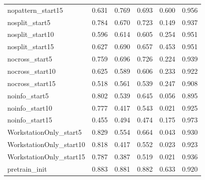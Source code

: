 \begin{table}[htbp]
\begin{tabularx}{\textwidth}{@{}lXXXXX@{}}
nopattern\_start15 & 0.631 & 0.769 & 0.693 & 0.600 & 0.956 \\
nosplit\_start5 & 0.784 & 0.670 & 0.723 & 0.149 & 0.937 \\
nosplit\_start10 & 0.596 & 0.614 & 0.605 & 0.254 & 0.951 \\
nosplit\_start15 & 0.627 & 0.690 & 0.657 & 0.453 & 0.951 \\
nocross\_start5 & 0.759 & 0.696 & 0.726 & 0.224 & 0.939 \\
nocross\_start10 & 0.625 & 0.589 & 0.606 & 0.233 & 0.922 \\
nocross\_start15 & 0.518 & 0.561 & 0.539 & 0.247 & 0.908 \\
noinfo\_start5 & 0.802 & 0.539 & 0.645 & 0.056 & 0.895 \\
noinfo\_start10 & 0.777 & 0.417 & 0.543 & 0.021 & 0.925 \\
noinfo\_start15 & 0.455 & 0.494 & 0.474 & 0.175 & 0.973 \\
WorkstationOnly\_start5 & 0.829 & 0.554 & 0.664 & 0.043 & 0.930 \\
WorkstationOnly\_start10 & 0.818 & 0.417 & 0.552 & 0.023 & 0.923 \\
WorkstationOnly\_start15 & 0.787 & 0.387 & 0.519 & 0.021 & 0.936 \\
pretrain\_init & 0.883 & 0.881 & 0.882 & 0.633 & 0.920 \\
\bottomrule
\end{tabularx}
\end{table}

